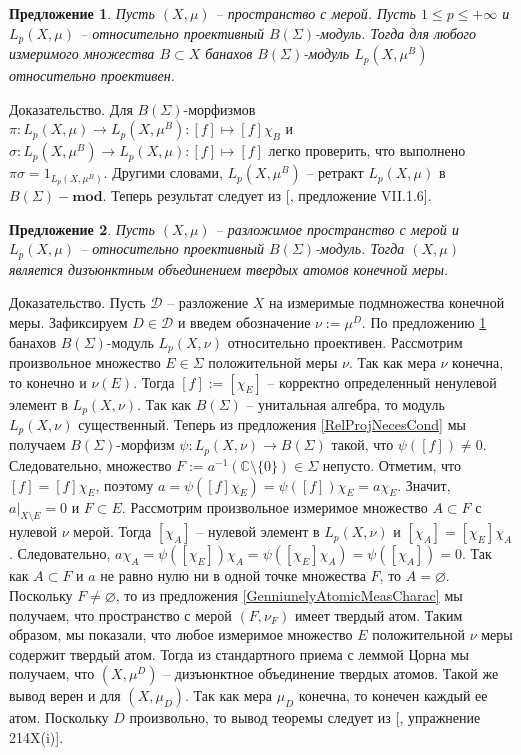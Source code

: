 \documentclass[12pt]{article}
\numberwithin{equation}{subsection}
\theoremstyle{plain}
\newtheorem{proposition}{Предложение}
\newenvironment{proof}{Доказательство.}{}
\begin{document}
\begin{fulltext}
    \begin{proposition}\label{BSigmaModLpRetrProj} Пусть $(X,\mu)$ -- пространство с мерой. Пусть $1\leq p\leq +\infty$ и $L_p(X,\mu)$ -- относительно проективный $B(\Sigma)$-модуль. Тогда для любого измеримого множества $B\subset X$ банахов $B(\Sigma)$-модуль $L_p(X,\mu^B)$ относительно проективен.
    \end{proposition}
    \begin{proof} Для $B(\Sigma)$-морфизмов $\pi:L_p(X,\mu)\to L_p(X,\mu^B):[f]\mapsto [f]\chi_B$ и $\sigma:L_p(X,\mu^B)\to L_p(X,\mu):[f]\mapsto [f]$ легко проверить, что выполнено $\pi\sigma=1_{L_p(X,\mu^B)}$. Другими словами, $L_p(X,\mu^B)$ -- ретракт $L_p(X,\mu)$ в $B(\Sigma)-\mathbf{mod}$. Теперь результат следует из  [\cite{HelBanLocConvAlg}, предложение VII.1.6].
    \end{proof}

    \begin{proposition}\label{LpBSigmaModNecessCond} Пусть $(X,\mu)$ -- разложимое пространство с мерой и $L_p(X,\mu)$ -- относительно проективный $B(\Sigma)$-модуль. Тогда $(X,\mu)$ является дизъюнктным объединением твердых атомов конечной меры.
    \end{proposition}
    \begin{proof} Пусть $\mathcal{D}$ -- разложение $X$ на измеримые подмножества конечной меры. Зафиксируем $D\in\mathcal{D}$ и введем обозначение $\nu:=\mu^D$. По предложению \ref{BSigmaModLpRetrProj} банахов $B(\Sigma)$-модуль $L_p(X,\nu)$ относительно проективен. Рассмотрим произвольное множество $E\in\Sigma$ положительной меры $\nu$. Так как мера $\nu$ конечна, то конечно и $\nu(E)$. Тогда $[f]:=[\chi_E]$ -- корректно определенный ненулевой элемент в $L_p(X,\nu)$. Так как $B(\Sigma)$ -- унитальная алгебра, то модуль $L_p(X,\nu)$ существенный. Теперь из предложения \ref{RelProjNecesCond} мы получаем $B(\Sigma)$-морфизм $\psi:L_p(X,\nu)\to B(\Sigma)$ такой, что $\psi([f])\neq 0$. Следовательно, множество $F:=a^{-1}(\mathbb{C}\setminus\{0\})\in\Sigma$ непусто. Отметим, что $[f]=[f]\chi_E$, поэтому $a=\psi([f]\chi_E)=\psi([f])\chi_E=a\chi_E$. Значит, $a|_{X\setminus E}=0$ и $F\subset E$. Рассмотрим произвольное измеримое множество $A\subset F$ с нулевой $\nu$ мерой. Тогда $[\chi_A]$ -- нулевой элемент в  $L_p(X,\nu)$ и $[\chi_A]=[\chi_E]\chi_A$. Следовательно, $a\chi_A=\psi([\chi_E])\chi_A=\psi([\chi_E]\chi_A)=\psi([\chi_A])=0$. Так как $A\subset F$ и $a$ не равно нулю ни в одной точке множества $F$, то $A=\varnothing$. Поскольку $F\neq \varnothing$, то из предложения \ref{GenniunelyAtomicMeasCharac} мы получаем, что пространство с мерой $(F,\nu_F)$ имеет твердый атом. Таким образом, мы показали, что любое измеримое множество $E$ положительной $\nu$ меры содержит твердый атом. Тогда из стандартного приема с леммой Цорна мы получаем, что $(X,\mu^D)$ --  дизъюнктное объединение твердых атомов. Такой же вывод верен и для $(X,\mu_D)$. Так как мера $\mu_D$ конечна, то конечен каждый ее атом. Поскольку $D$ произвольно, то вывод теоремы следует из [\cite{FremMeasTh2}, упражнение 214X(i)].
    \end{proof}


\end{fulltext}
\end{document}
